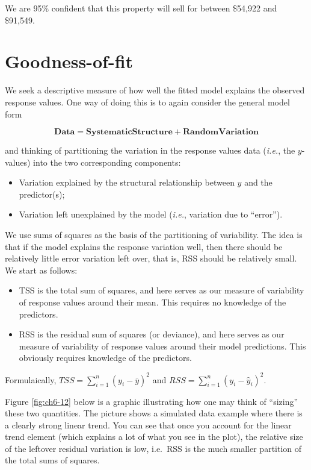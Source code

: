 \documentclass[
]{book}
\providecommand{\tightlist}{%
  \setlength{\itemsep}{0pt}\setlength{\parskip}{0pt}}
\begin{document}
We are 95\% confident that this property will sell for between \$54,922 and \$91,549.

\hypertarget{goodness-of-fit}{%
\section{Goodness-of-fit}\label{goodness-of-fit}}

We seek a descriptive measure of how well the fitted model explains the observed response values.
One way of doing this is to again consider the general model form

\[\mathbf{Data} = \mathbf{Systematic Structure} + \mathbf{Random Variation}\]

and thinking of partitioning the variation in the response values data (\emph{i.e.}, the \(y\)-values) into the two corresponding components:

\begin{itemize}
\tightlist
\item
  Variation explained by the structural relationship between \(y\) and the predictor(s);
\item
  Variation left unexplained by the model (\emph{i.e.}, variation due to ``error'').
\end{itemize}

We use sums of squares as the basis of the partitioning of variability.
The idea is that if the model explains the response variation well, then there should be relatively little error variation left over, that is, RSS should be relatively small.
We start as follows:

\begin{itemize}
\tightlist
\item
  TSS is the total sum of squares, and here serves as our measure of variability of response values around their mean. This requires no knowledge of the predictors.
\item
  RSS is the residual sum of squares (or deviance), and here serves as our measure of variability of response values around their model predictions. This obviously requires knowledge of the predictors.
\end{itemize}

Formulaically, \(TSS = \sum_{i=1}^n (y_i - \bar{y})^2\) and \(RSS = \sum_{i=1}^n (y_i - \hat{y}_i)^2\).

Figure \ref{fig:ch6-12} below is a graphic illustrating how one may think of ``sizing'' these two quantities.
The picture shows a simulated data example where there is a clearly strong linear trend.
You can see that once you account for the linear trend element (which explains a lot of what you see in the plot), the relative size of the leftover residual variation is low, i.e.~RSS is the much smaller partition of the total sums of squares.
\end{document}
